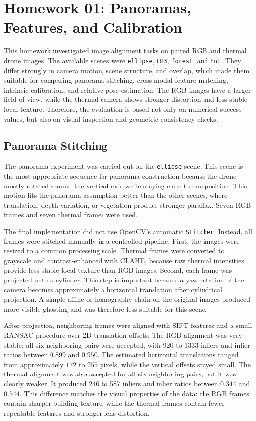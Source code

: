 \section{Homework 01: Panoramas, Features, and Calibration}

This homework investigated image alignment tasks on paired RGB and thermal
drone images. The available scenes were \texttt{ellipse}, \texttt{FH3},
\texttt{forest}, and \texttt{hut}. They differ strongly in camera motion,
scene structure, and overlap, which made them suitable for comparing panorama
stitching, cross-modal feature matching, intrinsic calibration, and relative
pose estimation. The RGB images have a larger field of view, while the thermal
camera shows stronger distortion and less stable local texture. Therefore, the
evaluation is based not only on numerical success values, but also on visual
inspection and geometric consistency checks.

\subsection{Panorama Stitching}

The panorama experiment was carried out on the \texttt{ellipse} scene. This
scene is the most appropriate sequence for panorama construction because the
drone mostly rotated around the vertical axis while staying close to one
position. This motion fits the panorama assumption better than the other
scenes, where translation, depth variation, or vegetation produce stronger
parallax. Seven RGB frames and seven thermal frames were used.

The final implementation did not use OpenCV's automatic \texttt{Stitcher}.
Instead, all frames were stitched manually in a controlled pipeline. First, the
images were resized to a common processing scale. Thermal frames were converted
to grayscale and contrast-enhanced with CLAHE, because raw thermal intensities
provide less stable local texture than RGB images. Second, each frame was
projected onto a cylinder. This step is important because a yaw rotation of the
camera becomes approximately a horizontal translation after cylindrical
projection. A simple affine or homography chain on the original images produced
more visible ghosting and was therefore less suitable for this scene.

After projection, neighboring frames were aligned with SIFT features and a
small RANSAC procedure over 2D translation offsets. The RGB alignment was very
stable: all six neighboring pairs were accepted, with 920 to 1333 inliers and
inlier ratios between \(0.899\) and \(0.950\). The estimated horizontal
translations ranged from approximately \(172\) to \(255\) pixels, while the
vertical offsets stayed small. The thermal alignment was also accepted for all
six neighboring pairs, but it was clearly weaker. It produced 246 to 587
inliers and inlier ratios between \(0.344\) and \(0.544\). This difference
matches the visual properties of the data: the RGB frames contain sharper
building texture, while the thermal frames contain fewer repeatable features
and stronger lens distortion.

